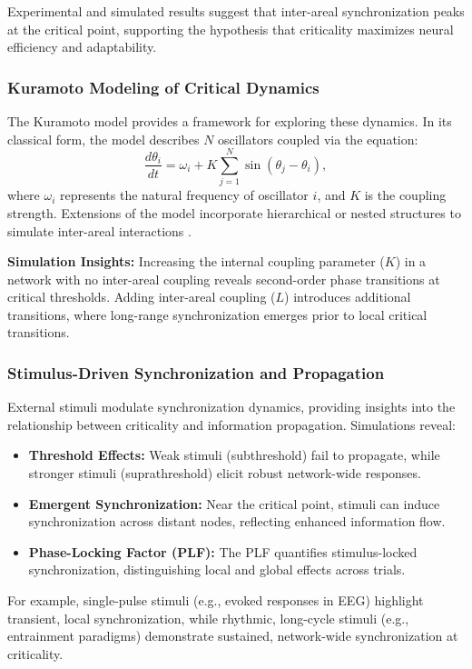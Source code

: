 Experimental and simulated results suggest that inter-areal synchronization peaks at the critical point, supporting the hypothesis that criticality maximizes neural efficiency and adaptability. 

\subsubsection*{Kuramoto Modeling of Critical Dynamics}

The Kuramoto model provides a framework for exploring these dynamics. In its classical form, the model describes \( N \) oscillators coupled via the equation: 
\[
\frac{d\theta_i}{dt} = \omega_i + K \sum_{j=1}^N \sin(\theta_j - \theta_i),
\]
where \( \omega_i \) represents the natural frequency of oscillator \( i \), and \( K \) is the coupling strength. Extensions of the model incorporate hierarchical or nested structures to simulate inter-areal interactions \cite{arenas2008synchronization}. 

\textbf{Simulation Insights:} Increasing the internal coupling parameter (\( K \)) in a network with no inter-areal coupling reveals second-order phase transitions at critical thresholds. Adding inter-areal coupling (\( L \)) introduces additional transitions, where long-range synchronization emerges prior to local critical transitions.

\subsubsection*{Stimulus-Driven Synchronization and Propagation}

External stimuli modulate synchronization dynamics, providing insights into the relationship between criticality and information propagation. Simulations reveal: 
\begin{itemize}
    \item \textbf{Threshold Effects:} Weak stimuli (subthreshold) fail to propagate, while stronger stimuli (suprathreshold) elicit robust network-wide responses.
    \item \textbf{Emergent Synchronization:} Near the critical point, stimuli can induce synchronization across distant nodes, reflecting enhanced information flow.
    \item \textbf{Phase-Locking Factor (PLF):} The PLF quantifies stimulus-locked synchronization, distinguishing local and global effects across trials.
\end{itemize}

For example, single-pulse stimuli (e.g., evoked responses in EEG) highlight transient, local synchronization, while rhythmic, long-cycle stimuli (e.g., entrainment paradigms) demonstrate sustained, network-wide synchronization at criticality.

